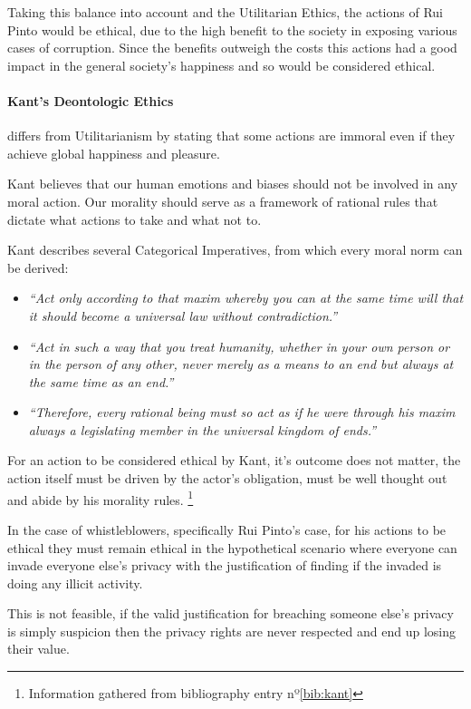     Taking this balance into account and the Utilitarian Ethics, the actions of Rui Pinto would be ethical, due to the high benefit to the society in exposing various cases of corruption.
    Since the benefits outweigh the costs this actions had a good impact in the general society's happiness and so would be considered ethical.

\paragraph{Kant's Deontologic Ethics}
    differs from Utilitarianism by stating that some actions are immoral even if they achieve global happiness and pleasure.
    
    Kant believes that our human emotions and biases should not be involved in any  moral action.
    Our morality should serve as a framework of rational rules that dictate what actions to take and what not to.
    
    Kant describes several Categorical Imperatives, from which every moral norm can be derived:
    \begin{itemize}
        \item \textit{“Act only according to that maxim whereby you can at the same time will that it should become a universal law without contradiction.”}
        \item \textit{“Act in such a way that you treat humanity, whether in your own person or in the person of any other, never merely as a means to an end but always at the same time as an end.” }
        \item \textit{“Therefore, every rational being must so act as if he were through his maxim always a legislating member in the universal kingdom of ends.”}
    \end{itemize}
    
    For an action to be considered ethical by Kant, it's outcome does not matter, the action itself must be driven by the actor's obligation, must be well thought out and abide by his morality rules.
    \footnote{Information gathered from bibliography entry nº\ref{bib:kant}}

    In the case of whistleblowers, specifically Rui Pinto's case, for his actions to be ethical they must remain ethical in the hypothetical scenario where everyone can invade everyone else's privacy with the justification of finding if the invaded is doing any illicit activity.
    
    This is not feasible, if the valid justification for breaching someone else's privacy is simply suspicion then the privacy rights are never respected and end up losing their value.

